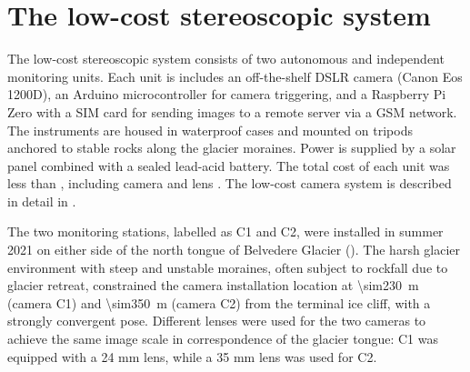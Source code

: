 \section{The low-cost stereoscopic system}\label{sec:4:system}

The low-cost stereoscopic system consists of two autonomous and independent monitoring
units. Each unit is includes an off-the-shelf DSLR camera (Canon Eos 1200D), an Arduino
microcontroller for camera triggering, and a Raspberry Pi
Zero with a SIM card for sending images to a remote server via a GSM
network\citep{ioli2023_replicable}.
The instruments are housed in waterproof cases and mounted on tripods anchored to stable
rocks along the glacier moraines.
Power is supplied by a solar panel combined with a sealed lead-acid battery.
The total cost of each unit was less than , including
camera and lens \citep{ioli2023_replicable}.
The low-cost camera system is described in detail in \citet{ioli2023_replicable}.

The two monitoring stations, labelled as C1 and C2, were installed in summer 2021 on
either side of the north tongue of Belvedere Glacier ().
The harsh glacier environment with steep and unstable moraines, often subject to rockfall
due to glacier retreat, constrained the camera installation location at
\SI{\sim230}{\meter} (camera C1) and \SI{\sim350}{\meter} (camera C2) from the terminal
ice cliff, with a strongly convergent pose.
Different lenses were used for the two cameras to achieve the same image scale in
correspondence of the glacier tongue: C1 was equipped with a 24 mm lens, while a 35 mm
lens was used for C2.

